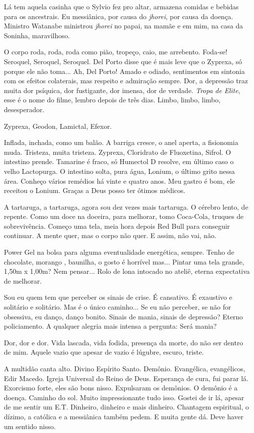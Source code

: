 Lá tem aquela casinha que o Sylvio fez pro altar, armazena comidas e
bebidas para os ancestrais. Eu messiânica, por causa do \emph{jhorei},
por causa da doença. Ministro Watanabe ministrou \emph{jhorei} no papai,
na mamãe e em mim, na casa da Soninha, maravilhoso.

O corpo roda, roda, roda como pião, tropeço, caio, me arrebento.
Foda-se! Seroquel, Seroquel, Seroquel. Del Porto disse que é mais leve
que o Zyprexa, só porque ele não toma... Ah, Del Porto! Amado e odiado,
sentimentos em sintonia com os efeitos colaterais, mas respeito e
admiração sempre. Dor, a depressão traz muita dor psíquica, dor
fustigante, dor imensa, dor de verdade. \emph{Tropa de Elite}, esse é o
nome do filme, lembro depois de três dias. Limbo, limbo, limbo,
desesperador.

Zyprexa, Geodon, Lamictal, Efexor.

Inflada, inchada, como um balão. A barriga cresce, o anel aperta, a
fisionomia muda. Tristeza, muita tristeza. Zyprexa, Cloridrato de
Fluoxetina, Sifrol. O intestino prende. Tamarine é fraco, só Humectol D
resolve, em último caso o velho Lactopurga. O intestino solta, pura
água, Lonium, o último grito nessa área. Conheço vários remédios há
vinte e quatro anos. Meu gastro é bom, ele receitou o Lonium. Graças a
Deus posso ter ótimos médicos.

A tartaruga, a tartaruga, agora sou dez vezes mais tartaruga. O cérebro
lento, de repente. Como um doce na doceira, para melhorar, tomo
Coca-Cola, truques de sobrevivência. Começo uma tela, meia hora depois
Red Bull para conseguir continuar. A mente quer, mas o corpo não quer. E
assim, não vai, não.

Power Gel na bolsa para alguma eventualidade energética, sempre. Tenho
de chocolate, morango , baunilha, o gosto é horrível mas... Pintar uma
tela grande, 1,50m x 1,00m? Nem pensar... Rolo de lona intocado no
ateliê, eterna expectativa de melhorar.

Sou eu quem tem que perceber os sinais de crise. É cansativo. É
exaustivo e solitário e solitário. Mas é o único caminho... Se eu não
perceber, se não for obsessiva, eu danço, danço bonito. Sinais de mania,
sinais de depressão? Eterno policiamento. A qualquer alegria mais
intensa a pergunta: Será mania?

Dor, dor e dor. Vida lascada, vida fodida, presença da morte, do não ser
dentro de mim. Aquele vazio que apesar de vazio é lúgubre, escuro,
triste.

A multidão canta alto. Divino Espírito Santo. Demônio. Evangélica,
evangélicos, Edir Macedo. Igreja Universal do Reino de Deus. Esperança
de cura, fui parar lá. Exorcismo forte, eles são bons nisso. Expulsaram
os demônios. O demônio é a doença. Caminho do sol. Muito impressionante
tudo isso. Gostei de ir lá, apesar de me sentir um E.T. Dinheiro,
dinheiro e mais dinheiro. Chantagem espiritual, o dízimo, a católica e a
messiânica também pedem. E muita gente dá. Deve haver um sentido nisso.

